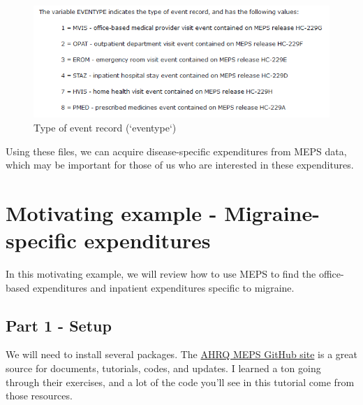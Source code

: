 \documentclass[
]{book}
\begin{document}
\begin{figure}
\includegraphics[width=1\linewidth]{Figure 4_2} \caption{Type of event record (`eventype`)}\label{fig:unnamed-chunk-35}
\end{figure}

Using these files, we can acquire disease-specific expenditures from MEPS data, which may be important for those of us who are interested in these expenditures.

\hypertarget{motivating-example---migraine-specific-expenditures}{%
\section{Motivating example - Migraine-specific expenditures}\label{motivating-example---migraine-specific-expenditures}}

In this motivating example, we will review how to use MEPS to find the office-based expenditures and inpatient expenditures specific to migraine.

\hypertarget{part-1---setup}{%
\subsection{Part 1 - Setup}\label{part-1---setup}}

We will need to install several packages. The \href{https://github.com/HHS-AHRQ/MEPS}{AHRQ MEPS GitHub site} is a great source for documents, tutorials, codes, and updates. I learned a ton going through their exercises, and a lot of the code you'll see in this tutorial come from those resources.
\end{document}
